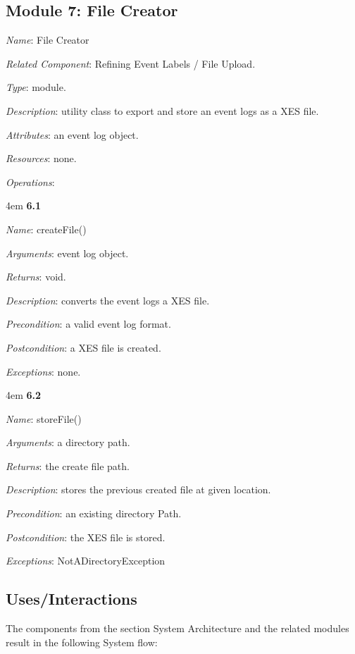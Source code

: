 \documentclass[notitlepage]{article}
\begin{document}
\begin{flushleft}
\subsection{Module 7: File Creator}
\textit{Name}: File Creator

\textit{Related Component}: Refining Event Labels / File Upload.

\textit{Type}: module.

\textit{Description}: utility class to export and store an event logs as a XES file.

\textit{Attributes}: an event log object.

\textit{Resources}: none.

\textit{Operations}: 
\medskip
\par
\begingroup
\leftskip4em
\textbf{6.1} 

\textit{Name}: createFile()

\textit{Arguments}: event log object.

\textit{Returns}: void.

\textit{Description}: converts the event logs a XES file.

\textit{Precondition}: a valid event log format.

\textit{Postcondition}: a XES file is created.

\textit{Exceptions}: none.
\par
\endgroup

\medskip
\par
\begingroup
\leftskip4em
\textbf{6.2} 

\textit{Name}: storeFile()

\textit{Arguments}: a directory path.

\textit{Returns}: the create file path.

\textit{Description}: stores the previous created file at given location.

\textit{Precondition}: an existing directory Path.

\textit{Postcondition}: the XES file is stored.

\textit{Exceptions}: NotADirectoryException
\par
\endgroup

\subsection{Uses/Interactions}
The components from the section System Architecture and the related modules result in the following System flow:\\


\end{flushleft}
\end{document}
